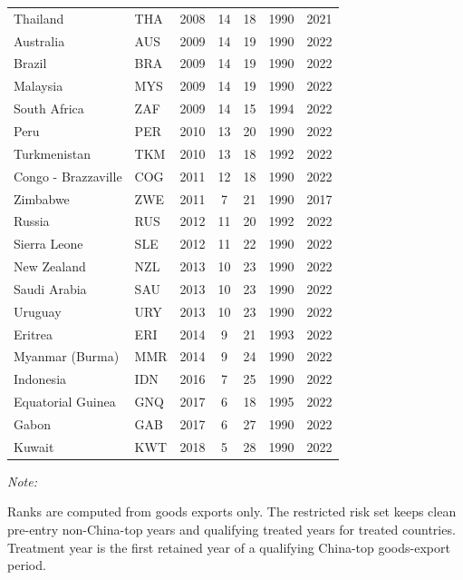 \documentclass[
  12pt,
]{article}
\begin{document}
\begin{table}[!h]
{\begin{threeparttable}
\begin{tabular}[t]{llccccc}
\addlinespace
Thailand & THA & 2008 & 14 & 18 & 1990 & 2021\\
Australia & AUS & 2009 & 14 & 19 & 1990 & 2022\\
Brazil & BRA & 2009 & 14 & 19 & 1990 & 2022\\
Malaysia & MYS & 2009 & 14 & 19 & 1990 & 2022\\
South Africa & ZAF & 2009 & 14 & 15 & 1994 & 2022\\
\addlinespace
Peru & PER & 2010 & 13 & 20 & 1990 & 2022\\
Turkmenistan & TKM & 2010 & 13 & 18 & 1992 & 2022\\
Congo - Brazzaville & COG & 2011 & 12 & 18 & 1990 & 2022\\
Zimbabwe & ZWE & 2011 & 7 & 21 & 1990 & 2017\\
Russia & RUS & 2012 & 11 & 20 & 1992 & 2022\\
\addlinespace
Sierra Leone & SLE & 2012 & 11 & 22 & 1990 & 2022\\
New Zealand & NZL & 2013 & 10 & 23 & 1990 & 2022\\
Saudi Arabia & SAU & 2013 & 10 & 23 & 1990 & 2022\\
Uruguay & URY & 2013 & 10 & 23 & 1990 & 2022\\
Eritrea & ERI & 2014 & 9 & 21 & 1993 & 2022\\
\addlinespace
Myanmar (Burma) & MMR & 2014 & 9 & 24 & 1990 & 2022\\
Indonesia & IDN & 2016 & 7 & 25 & 1990 & 2022\\
Equatorial Guinea & GNQ & 2017 & 6 & 18 & 1995 & 2022\\
Gabon & GAB & 2017 & 6 & 27 & 1990 & 2022\\
Kuwait & KWT & 2018 & 5 & 28 & 1990 & 2022\\
\bottomrule
\end{tabular}
\begin{tablenotes}
\item \textit{Note: } 
\item Ranks are computed from goods exports only. The restricted risk set keeps clean pre-entry non-China-top years and qualifying treated years for treated countries. Treatment year is the first retained year of a qualifying China-top goods-export period.
\end{tablenotes}
\end{threeparttable}}
\end{table}
\end{document}
